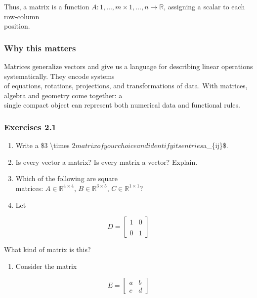 \documentclass[
  12pt,
  a4paper,
]{article}
\begin{document}
Thus, a matrix is a function
\(A: {1,\dots,m} \times {1,\dots,n} \to \mathbb{R}\), assigning a scalar
to each row-column\\
position.

\subsubsection{Why this matters}\label{why-this-matters-4}

Matrices generalize vectors and give us a language for describing linear
operations systematically. They encode systems\\
of equations, rotations, projections, and transformations of data. With
matrices, algebra and geometry come together: a\\
single compact object can represent both numerical data and functional
rules.

\subsubsection{Exercises 2.1}\label{exercises-21}

\begin{enumerate}
\def\labelenumi{\arabic{enumi}.}
\item
  Write a \$3 \textbackslash times
  2\( matrix of your choice and identify its entries \)a\_\{ij\}\$.
\item
  Is every vector a matrix? Is every matrix a vector? Explain.
\item
  Which of the following are square\\
  matrices: \(A \in \mathbb{R}^{4\times4}\),
  \(B \in \mathbb{R}^{3\times5}\), \(C \in \mathbb{R}^{1\times1}\)?
\item
  Let
\end{enumerate}

\[D = \begin{bmatrix} 1 & 0 \\\\ 0 & 1 \end{bmatrix}\]

What kind of matrix is this?

\begin{enumerate}
\def\labelenumi{\arabic{enumi}.}
\item
  Consider the matrix
\end{enumerate}

\[E = \begin{bmatrix} a & b \\ c & d \end{bmatrix}\]
\end{document}

